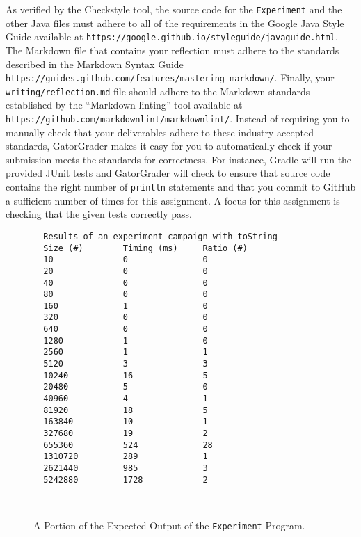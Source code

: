 \documentclass[11pt]{article}
\newcommand{\mainprogram}{\lstinline{Experiment}}
\newcommand{\reflection}{\lstinline{writing/reflection.md}}
\newcommand{\program}[1]{\lstinline{#1}}
\newcommand{\url}[1]{\lstinline{#1}}
\newcommand{\step}[1]{``{#1}''}
\begin{document}
As verified by the Checkstyle tool, the source code for the \mainprogram{} and
the other Java files must adhere to all of the requirements in the Google Java
Style Guide available at
\url{https://google.github.io/styleguide/javaguide.html}. The Markdown file that
contains your reflection must adhere to the standards described in the Markdown
Syntax Guide \url{https://guides.github.com/features/mastering-markdown/}.
Finally, your \reflection{} file should adhere to the Markdown standards
established by the \step{Markdown linting} tool available at
\url{https://github.com/markdownlint/markdownlint/}. Instead of requiring you to
manually check that your deliverables adhere to these industry-accepted
standards, GatorGrader makes it easy for you to automatically check if your
submission meets the standards for correctness. For instance, Gradle will run
the provided JUnit tests and GatorGrader will check to ensure that source code
contains the right number of \program{println} statements and that you commit to
GitHub a sufficient number of times for this assignment. A focus for this
assignment is checking that the given tests correctly pass.

  \begin{figure}[t]
    \centering
    \begin{verbatim}
  Results of an experiment campaign with toString
  Size (#)        Timing (ms)     Ratio (#)
  10              0               0
  20              0               0
  40              0               0
  80              0               0
  160             1               0
  320             0               0
  640             0               0
  1280            1               0
  2560            1               1
  5120            3               3
  10240           16              5
  20480           5               0
  40960           4               1
  81920           18              5
  163840          10              1
  327680          19              2
  655360          524             28
  1310720         289             1
  2621440         985             3
  5242880         1728            2
  \end{verbatim}
  \vspace*{-.35in}
  \caption{A Portion of the Expected Output of the \mainprogram{} Program.}~\label{fig:output}
  \vspace*{-.25in}
\end{figure}
\end{document}

